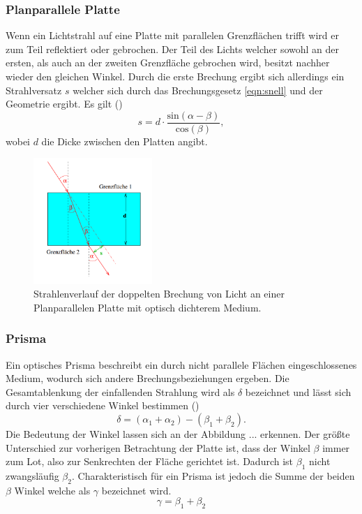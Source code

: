 \subsubsection{Planparallele Platte}
Wenn ein Lichtstrahl auf eine Platte mit parallelen Grenzflächen trifft wird er zum Teil reflektiert oder gebrochen. Der Teil des Lichts welcher sowohl an der ersten, als auch an der zweiten Grenzfläche gebrochen wird, besitzt
nachher wieder den gleichen Winkel. Durch die erste Brechung ergibt sich allerdings ein Strahlversatz $s$ welcher sich durch das Brechungsgesetz \eqref{eqn:snell} und der Geometrie ergibt. Es gilt (\cite{skript})
\begin{equation}
s = d \cdot \frac{\text{sin}(\alpha - \beta)}{\text{cos}(\beta)},
\end{equation}
wobei $d$ die Dicke zwischen den Platten angibt.
\begin{figure}
    \centering
    \includegraphics[width=0.4\textwidth]{bilder/4.png}
    \caption{Strahlenverlauf der doppelten Brechung von Licht an einer Planparallelen Platte mit optisch dichterem Medium.  \cite{skript}}
    \label{fig:planparallel}
\end{figure}
\subsubsection{Prisma}
Ein optisches Prisma beschreibt ein durch nicht parallele Flächen eingeschlossenes Medium, wodurch sich andere Brechungsbeziehungen ergeben. Die Gesamtablenkung der einfallenden Strahlung wird als $\delta$ bezeichnet und 
lässt sich durch vier verschiedene Winkel bestimmen (\cite{skript})
\begin{equation}
    \label{eqn:deltaw}
\delta = (\alpha_1 + \alpha_2) - (\beta_1 + \beta_2).
\end{equation}
Die Bedeutung der Winkel lassen sich an der Abbildung ... erkennen. Der größte Unterschied zur vorherigen Betrachtung der Platte ist, dass der Winkel $\beta$ immer zum Lot, also zur Senkrechten der Fläche gerichtet ist. Dadurch ist $\beta_1$ nicht zwangsläufig $\beta_2$.
Charakteristisch für ein Prisma ist jedoch die Summe der beiden $\beta$ Winkel welche als $\gamma$ bezeichnet wird.
\begin{equation*}
\gamma = \beta_1 + \beta_2
\end{equation*}


